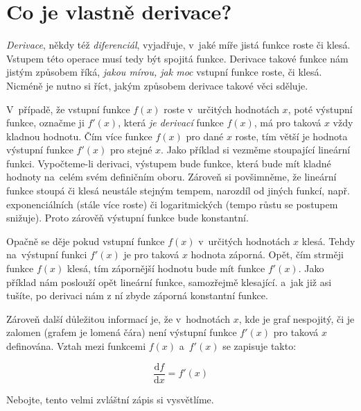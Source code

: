 \pagebreak
\section{Co je vlastně derivace?}

\textit{Derivace}, někdy též \textit{diferenciál}, vyjadřuje, v~jaké míře jistá funkce roste či klesá. Vstupem této operace musí tedy být spojitá funkce. Derivace takové funkce nám jistým způsobem říká, \emph{jakou mírou, jak moc} vstupní funkce roste, či klesá. Nicméně je nutno si říct, jakým způsobem derivace takové věci sděluje.

V~případě, že vstupní funkce $f(x)$ roste v~určitých hodnotách $x$, poté výstupní funkce, označme ji $f'(x)$, která \textit{je derivací} funkce $f(x)$, má pro taková $x$ vždy kladnou hodnotu. Čím více funkce $f(x)$ pro dané $x$ roste, tím větší je hodnota výstupní funkce $f'(x)$ pro stejné $x$. Jako příklad si vezměme stoupající lineární funkci. Vypočteme-li derivaci, výstupem bude funkce, která bude mít kladné hodnoty na~celém svém definičním oboru. Zároveň si povšimněme, že lineární funkce stoupá či klesá neustále stejným tempem, narozdíl od jiných funkcí, např. exponenciálních (stále více roste) či logaritmických (tempo růstu se postupem snižuje). Proto zárověň výstupní funkce bude konstantní.

Opačně se děje pokud vstupní funkce $f(x)$ v~určitých hodnotách $x$ klesá. Tehdy na~výstupní funkci $f'(x)$ je pro taková $x$ hodnota záporná. Opět, čím strměji funkce $f(x)$ klesá, tím zápornější hodnotu bude mít funkce $f'(x)$. Jako příklad nám poslouží opět lineární funkce, samozřejmě klesající. a~jak již asi tušíte, po derivaci nám z ní zbyde záporná konstantní funkce.

Zároveň další důležitou informací je, že v~hodnotách $x$, kde je graf nespojitý, či je zalomen (grafem je lomená čára) není výstupní funkce $f'(x)$ pro taková $x$ definována. Vztah mezi funkcemi $f(x)$ a~$f'(x)$ se zapisuje takto:

\begin{equation*}
    \frac{\text{d}f}{\text{d}x} = f'(x)
\end{equation*}

Nebojte, tento velmi zvláštní zápis si vysvětlíme.